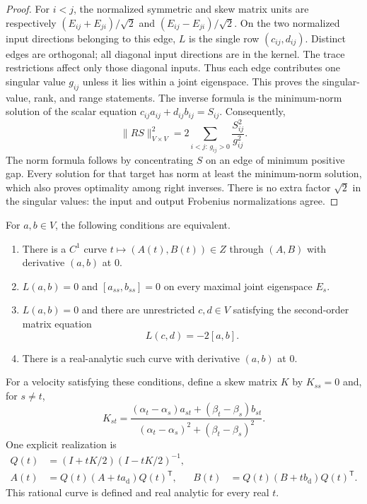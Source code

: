 \begin{proof}
For $i<j$, the normalized symmetric and skew matrix units are respectively
$(E_{ij}+E_{ji})/\sqrt2$ and $(E_{ij}-E_{ji})/\sqrt2$.  On the two normalized
input directions belonging to this edge, $L$ is the single row
$(c_{ij},d_{ij})$.  Distinct edges are orthogonal; all diagonal input
directions are in the kernel.  The trace restrictions affect only those
diagonal inputs.  Thus each edge contributes one singular value $g_{ij}$
unless it lies within a joint eigenspace.  This proves the singular-value,
rank, and range statements.  The inverse formula is the minimum-norm
solution of the scalar equation $c_{ij}a_{ij}+d_{ij}b_{ij}=S_{ij}$.
Consequently,
\[
 \|RS\|_{V\times V}^2
   =2\sum_{i<j:\,g_{ij}>0}\frac{S_{ij}^2}{g_{ij}^2}.
\]
The norm formula follows by concentrating $S$ on an edge of minimum
positive gap.  Every solution for that target has norm at least the
minimum-norm solution, which also proves optimality among right inverses.
There is no extra factor $\sqrt2$ in the singular values: the input and
output Frobenius normalizations agree.
\end{proof}

\begin{theorem}\label{thm:velocities}
For $a,b\in V$, the following conditions are equivalent.
\begin{enumerate}
\item There is a $C^1$ curve $t\mapsto(A(t),B(t))\in Z$ through $(A,B)$
with derivative $(a,b)$ at $0$.
\item $L(a,b)=0$ and $[a_{ss},b_{ss}]=0$ on every maximal joint eigenspace
$E_s$.
\item $L(a,b)=0$ and there are unrestricted $c,d\in V$ satisfying the
second-order matrix equation
\[
 L(c,d)=-2[a,b].
\]
\item There is a real-analytic such curve with derivative $(a,b)$ at $0$.
\end{enumerate}
For a velocity satisfying these conditions, define a skew matrix $K$ by
$K_{ss}=0$ and, for $s\ne t$,
\[
 K_{st}=
 \frac{(\alpha_t-\alpha_s)a_{st}+(\beta_t-\beta_s)b_{st}}
 { (\alpha_t-\alpha_s)^2+(\beta_t-\beta_s)^2 }.
\]
One explicit realization is
\begin{align*}
 Q(t)&=(I+tK/2)(I-tK/2)^{-1},\\
 A(t)&=Q(t)(A+t a_{\mathrm d})Q(t)^{\mathsf T},&
 B(t)&=Q(t)(B+t b_{\mathrm d})Q(t)^{\mathsf T}.
\end{align*}
This rational curve is defined and real analytic for every real $t$.
\end{theorem}

